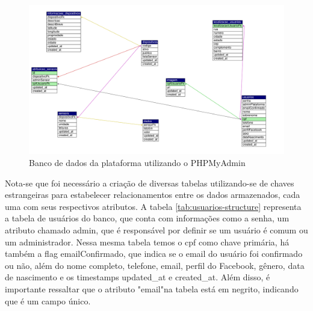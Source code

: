 \documentclass[tcc,capa]{texufpel}
\begin{document}
\begin{figure}[htbp]
  \centering \includegraphics[scale=.5]{assets/app_nosconectadosfk.png}
  \caption{Banco de dados da plataforma utilizando o PHPMyAdmin}
  \label{bancodedados}
\end{figure}
\newpage

Nota-se que foi necessário a criação de diversas tabelas utilizando-se de chaves estrangeiras para estabelecer relacionamentos entre os dados armazenados, cada uma com seus respectivos atributos. A tabela \ref{tab:usuarios-structure} representa a tabela de usuários do banco, que conta com informações como a senha, um atributo chamado admin, que é responsável por definir se um usuário é comum ou um administrador. Nessa mesma tabela temos o  cpf como chave primária, há também a flag emailConfirmado, que indica se o email do usuário foi confirmado ou não, além do nome completo, telefone, email, perfil do Facebook, gênero, data de nascimento e os timestamps updated\_at e created\_at. Além disso, é importante ressaltar que o atributo "email"\space na tabela está em negrito, indicando que é um campo único.
\end{document}
